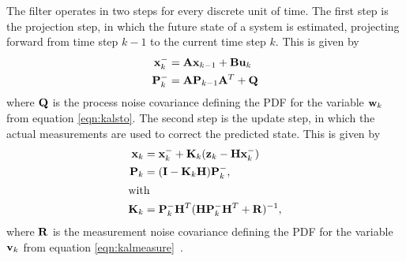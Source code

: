 The filter operates in two steps for every discrete unit of time. The first step is the projection step, in which the 
future state of a system is estimated, projecting forward from time step $k-1$ to the current time step $k$. This is 
given by
\begin{align}
    \mathbf{x}^-_k &= \mathbf{A}\mathbf{x}_{k-1}+\mathbf{B}\mathbf{u}_k\\
    \mathbf{P}^-_k &= \mathbf{A}\mathbf{P}_{k-1}\mathbf{A}^T+\mathbf{Q}
\end{align}
where $\mathbf{Q}$ is the process noise covariance defining the PDF for the variable $\mathbf{w}_k$ from equation \ref{eqn:kalsto}.
The second step is the update step, in which the actual measurements are used to correct the predicted state. This is
given by
\begin{align}
    \mathbf{x}_k &= \mathbf{x}^-_k+\mathbf{K}_k(\mathbf{z}_k-\mathbf{H}\mathbf{x}^-_k)\\
    \mathbf{P}_k &= (\mathbf{I}-\mathbf{K}_k\mathbf{H})\mathbf{P}^-_k,\\
\intertext{with}
    \mathbf{K}_k &= \mathbf{P}^-_k\mathbf{H}^T(\mathbf{H}\mathbf{P}^-_k\mathbf{H}^T+\mathbf{R})^{-1},
\end{align}
where $\mathbf{R}$ is the measurement noise covariance defining the PDF for the variable $\mathbf{v}_k$ from equation
\ref{eqn:kalmeasure}~\cite{siggraph01}.

